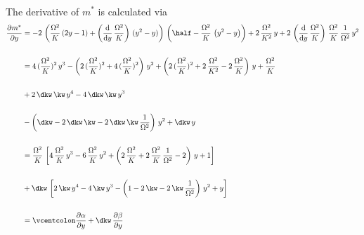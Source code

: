 \begin{appendices}
\begin{align*}
    \end{align*}
    The derivative of $m^*$ is calculated via
    \begin{align*}
        \frac{\partial m^*}{\partial{y}}&=-2\,\left(\frac{\Omega^2}{K}\,(2{y}-1)+\left(\frac{\text{d}}{\text{d}{y}}\,\frac{\Omega^2}{K}\right)\,({y}^2-{y})\right)\,\left( \half-\frac{\Omega^2}{K}\,\left( {y}^2- {y} \right) \right)+2\,\frac{\Omega^2}{K^2}\,{y}+2\,\left(\frac{\text{d}}{\text{d}{y}}\,\frac{\Omega^2}{K}\right)\,\frac{\Omega^2}{K}\,\frac{1}{\Omega^2}\,{y}^2\\\\
        &=4\,(\frac{\Omega^2}{K})^2\,{y}^3-\left(2\,(\frac{\Omega^2}{K})^2+4\,(\frac{\Omega^2}{K})^2\right)\,{y}^2+\left( 2\,(\frac{\Omega^2}{K})^2+2\,\frac{\Omega^2}{K^2}-2\,\frac{\Omega^2}{K} \right)\,{y}+\frac{\Omega^2}{K}\\\\
        &+2\,\dkw\,\kw\,{y}^4-4\,\dkw\,\kw\,{y}^3\\\\
        &-\left(\dkw-2\,\dkw\,\kw-2\,\dkw\,\kw\,\frac{1}{\Omega^2}\right)\,{y}^2+\dkw\,{y}\\\\
        &=\frac{\Omega^2}{K}\,\left[  4\,\frac{\Omega^2}{K}\,{y}^3-6\,\frac{\Omega^2}{K}\,{y}^2+\left( 2\,\frac{\Omega^2}{K}+2\,\frac{\Omega^2}{K}\,\frac{1}{\Omega^2}-2 \right)\,{y}+1 \right]\\\\
        &+\dkw\,\left[2\,\kw\,{y}^4-4\,\kw\,{y}^3-\left(1-2\,\kw-2\,\kw\,\frac{1}{\Omega^2}\right)\,{y}^2+{y}\right]\\\\
        &=\vcentcolon \frac{\partial \alpha}{\partial{y}}+\dkw\,\frac{\partial \beta}{\partial{y}}
    \end{align*}
    

\end{appendices}
